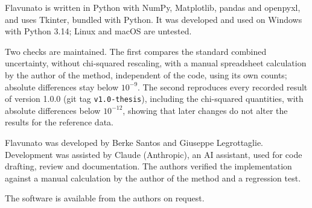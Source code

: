 Flavunato is written in Python with NumPy, Matplotlib, pandas and
openpyxl, and uses Tkinter, bundled with Python. It was developed and
used on Windows with Python 3.14; Linux and macOS are untested.

Two checks are maintained. The first compares the standard combined
uncertainty, without chi-squared rescaling, with a manual spreadsheet
calculation by the author of the method, independent of the code, using
its own counts; absolute differences stay below \(10^{-9}\). The second
reproduces every recorded result of version 1.0.0 (git tag
\texttt{v1.0-thesis}), including the chi-squared quantities, with
absolute differences below \(10^{-12}\), showing that later changes do
not alter the results for the reference data.

Flavunato was developed by Berke Santos and Giuseppe Legrottaglie.
Development was assisted by Claude (Anthropic), an AI assistant, used
for code drafting, review and documentation. The authors verified the
implementation against a manual calculation by the author of the method
and a regression test.

The software is available from the authors on request.
